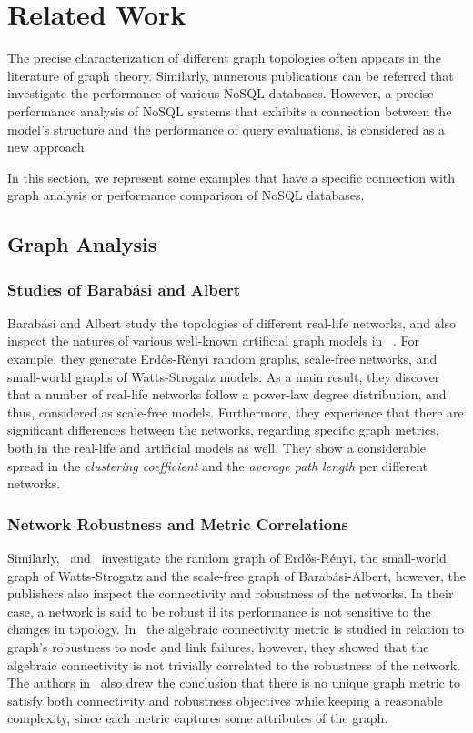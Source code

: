 \chapter{Related Work}

The precise characterization of different graph topologies often appears in the literature of graph theory. Similarly, numerous publications can be referred that investigate the performance of various NoSQL databases. However, a precise performance analysis of NoSQL systems that exhibits a connection between the model's structure and the performance of query evaluations, is considered as a new approach.

In this section, we represent some examples that have a specific connection with graph analysis or performance comparison of NoSQL databases.

\section{Graph Analysis}
\subsection{Studies of Barabási and Albert}

Barabási and Albert study the topologies of different real-life networks, and also inspect the natures of various well-known artificial graph models in ~\cite{statistical_mechanics}. For example, they generate Erdős-Rényi random graphs, scale-free networks, and small-world graphs of Watts-Strogatz models. As a main result, they discover that a number of real-life networks follow a power-law degree distribution, and thus, considered as scale-free models. Furthermore, they experience that there are significant differences between the networks, regarding specific graph metrics, both in the real-life and artificial models as well. They show a considerable spread in the \textit{clustering coefficient} and the \textit{average path length} per different networks.

\subsection{Network Robustness and Metric Correlations}\label{sec:algebraic_connectivity}

Similarly,~\cite{algebraic1} and~\cite{algebraic2} investigate the random graph of Erdős-Rényi, the small-world graph of Watts-Strogatz and the scale-free graph of Barabási-Albert, however, the publishers also inspect the connectivity and robustness of the networks. In their case, a network is said to be robust if its performance is not sensitive to the changes in topology. In~\cite{algebraic1} the algebraic connectivity metric is studied in relation to graph’s robustness to node and link failures, however, they showed that the algebraic connectivity is not trivially correlated to the robustness of the network. The authors in~\cite{algebraic2} also drew the conclusion that there is no unique graph metric to satisfy both connectivity and robustness objectives while keeping a reasonable complexity, since each metric captures some attributes of the graph.

